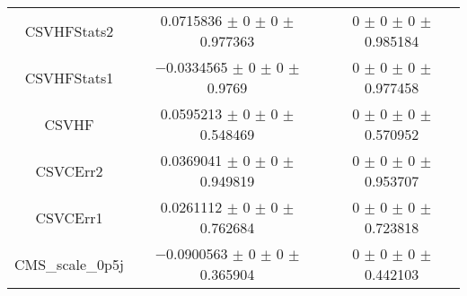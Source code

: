 \begin{table}
\begin{tabular}{ccc}
CSVHFStats2 	& \num{0.0715836} $\pm$ \num{0} $\pm$ \num{0} $\pm$ \num{0.977363} 	& \num{0} $\pm$ \num{0} $\pm$ \num{0} $\pm$ \num{0.985184}\\
CSVHFStats1 	& \num{-0.0334565} $\pm$ \num{0} $\pm$ \num{0} $\pm$ \num{0.9769} 	& \num{0} $\pm$ \num{0} $\pm$ \num{0} $\pm$ \num{0.977458}\\
CSVHF 	& \num{0.0595213} $\pm$ \num{0} $\pm$ \num{0} $\pm$ \num{0.548469} 	& \num{0} $\pm$ \num{0} $\pm$ \num{0} $\pm$ \num{0.570952}\\
CSVCErr2 	& \num{0.0369041} $\pm$ \num{0} $\pm$ \num{0} $\pm$ \num{0.949819} 	& \num{0} $\pm$ \num{0} $\pm$ \num{0} $\pm$ \num{0.953707}\\
CSVCErr1 	& \num{0.0261112} $\pm$ \num{0} $\pm$ \num{0} $\pm$ \num{0.762684} 	& \num{0} $\pm$ \num{0} $\pm$ \num{0} $\pm$ \num{0.723818}\\
CMS\_scale\_0p5j 	& \num{-0.0900563} $\pm$ \num{0} $\pm$ \num{0} $\pm$ \num{0.365904} 	& \num{0} $\pm$ \num{0} $\pm$ \num{0} $\pm$ \num{0.442103}\\
\bottomrule
\end{tabular}
\end{table}